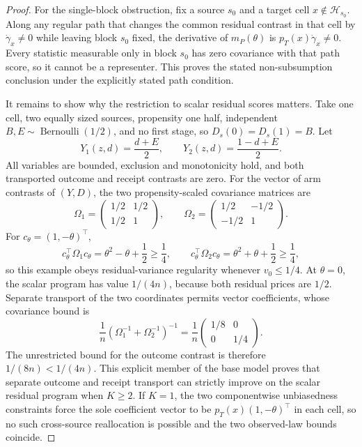 \documentclass{article}
\begin{document}
\begin{proof}
For the single-block obstruction, fix a source \(s_0\) and a target cell \(x\notin\mathcal H_{s_0}\). Along any regular path that changes the common residual contrast in that cell by \(\dot\gamma_x\ne0\) while leaving block \(s_0\) fixed, the derivative of \(m_P(\theta)\) is \(p_T(x)\dot\gamma_x\ne0\). Every statistic measurable only in block \(s_0\) has zero covariance with that path score, so it cannot be a representer. This proves the stated non-subsumption conclusion under the explicitly stated path condition.

It remains to show why the restriction to scalar residual scores matters. Take one cell, two equally sized sources, propensity one half, independent \(B,E\sim\operatorname{Bernoulli}(1/2)\), and no first stage, so \(D_s(0)=D_s(1)=B\). Let
\[
 Y_1(z,d)=\frac{d+E}{2},
 \qquad
 Y_2(z,d)=\frac{1-d+E}{2}.
\]
All variables are bounded, exclusion and monotonicity hold, and both transported outcome and receipt contrasts are zero. For the vector of arm contrasts of \((Y,D)\), the two propensity-scaled covariance matrices are
\[
 \Omega_1=
 \begin{pmatrix}1/2&1/2\\[2pt]1/2&1\end{pmatrix},
 \qquad
 \Omega_2=
 \begin{pmatrix}1/2&-1/2\\[2pt]-1/2&1\end{pmatrix}.
\]
For \(c_\theta=(1,-\theta)^\top\),
\[
 c_\theta^\top\Omega_1c_\theta
 =\theta^2-\theta+\frac12\ge\frac14,
 \qquad
 c_\theta^\top\Omega_2c_\theta
 =\theta^2+\theta+\frac12\ge\frac14,
\]
so this example obeys residual-variance regularity whenever \(v_0\le1/4\). At \(\theta=0\), the scalar program has value \(1/(4n)\), because both residual prices are \(1/2\). Separate transport of the two coordinates permits vector coefficients, whose covariance bound is
\[
 \frac1n\left(\Omega_1^{-1}+\Omega_2^{-1}\right)^{-1}
 =\frac1n
 \begin{pmatrix}1/8&0\\[2pt]0&1/4\end{pmatrix}.
\]
The unrestricted bound for the outcome contrast is therefore \(1/(8n)<1/(4n)\). This explicit member of the base model proves that separate outcome and receipt transport can strictly improve on the scalar residual program when \(K\ge2\). If \(K=1\), the two componentwise unbiasedness constraints force the sole coefficient vector to be \(p_T(x)(1,-\theta)^\top\) in each cell, so no such cross-source reallocation is possible and the two observed-law bounds coincide.
\end{proof}
\end{document}
